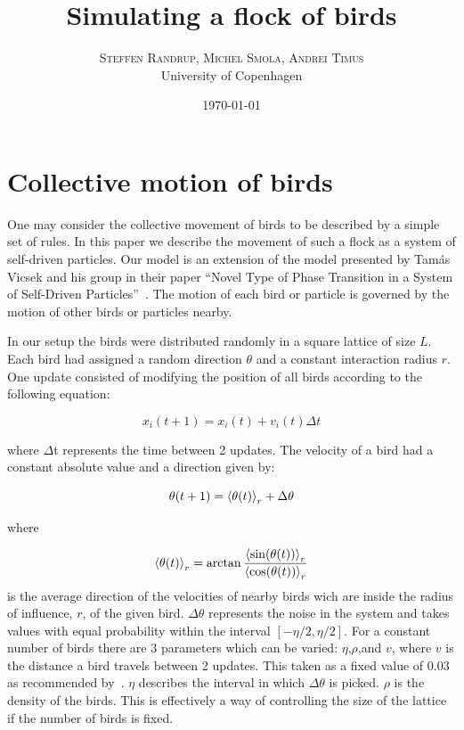 \documentclass[twoside,twocolumn]{article}
\title{Simulating a flock of birds} %
\author{%
\textsc{Steffen Randrup, Michel Smola, Andrei Timus}\\[1ex] %
\normalsize University of Copenhagen \\ %
}
\date{\today} %
\begin{document}
\maketitle


\section{Collective motion of birds}

One may consider the collective movement of birds to be described by a simple set of rules.
In this paper we describe the movement of such a flock as a system of self-driven particles.
Our model is an extension of the model presented by Tamás Vicsek and his group in their paper ``Novel Type of Phase Transition in a System of Self-Driven Particles''~\cite{Vicsek}.
The motion of each bird or particle is governed by the motion of other birds or particles nearby.

In our setup the birds were distributed randomly in a square lattice of size $L$.
Each bird had assigned a random direction $\theta$ and a constant interaction radius $r$.
One update consisted of modifying the position of all birds according to the following equation:


\begin{equation}
x_{i}(t+1)=x_i(t)+v_i(t)\Delta t
\end{equation}

where $\Delta$t represents the time between 2 updates.
The velocity of a bird had a constant absolute value and a direction given by:

\begin{equation}
\theta(t+1)=\braket{\theta(t)}_r+\Delta \theta
\end{equation} 

where 

\begin{equation}
  \braket{\theta(t)}_r=\arctan\frac{\braket{\sin(\theta(t))}_r}{\braket{\cos(\theta(t))}_r}
\end{equation}
%
is the average direction of the velocities of nearby birds wich are inside the radius of influence, $r$, of the given bird.
$\Delta \theta$ represents the noise in the system and takes values with equal probability within the interval $[-\eta/2,\eta/2]$.
For a constant number of birds there are 3 parameters which can be varied: $\eta$,$\rho$,and $v$,
where $v$ is the distance a bird travels between 2 updates. This taken as a fixed value of 0.03 as recommended by~\cite{Vicsek}.
$\eta$ describes the interval in which $\Delta\theta$ is picked. $\rho$ is the density of the birds.
This is effectively a way of controlling the size of the lattice if the number of birds is fixed.
\end{document}
